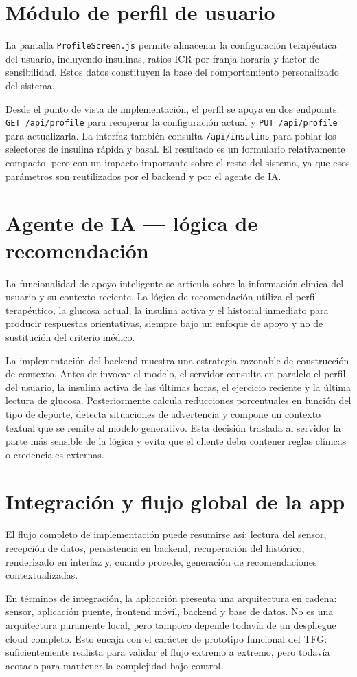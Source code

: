 \section{Módulo de perfil de usuario}

La pantalla \texttt{ProfileScreen.js} permite almacenar la configuración terapéutica del
usuario, incluyendo insulinas, ratios ICR por franja horaria y factor de sensibilidad.
Estos datos constituyen la base del comportamiento personalizado del sistema.

Desde el punto de vista de implementación, el perfil se apoya en dos endpoints:
\texttt{GET /api/profile} para recuperar la configuración actual y
\texttt{PUT /api/profile} para actualizarla. La interfaz también consulta
\texttt{/api/insulins} para poblar los selectores de insulina rápida y basal. El resultado
es un formulario relativamente compacto, pero con un impacto importante sobre el resto del
sistema, ya que esos parámetros son reutilizados por el backend y por el agente de IA.

\section{Agente de IA --- lógica de recomendación}

La funcionalidad de apoyo inteligente se articula sobre la información clínica del
usuario y su contexto reciente. La lógica de recomendación utiliza el perfil terapéutico,
la glucosa actual, la insulina activa y el historial inmediato para producir respuestas
orientativas, siempre bajo un enfoque de apoyo y no de sustitución del criterio médico.

La implementación del backend muestra una estrategia razonable de construcción de
contexto. Antes de invocar el modelo, el servidor consulta en paralelo el perfil del
usuario, la insulina activa de las últimas horas, el ejercicio reciente y la última
lectura de glucosa. Posteriormente calcula reducciones porcentuales en función del tipo de
deporte, detecta situaciones de advertencia y compone un contexto textual que se remite al
modelo generativo. Esta decisión traslada al servidor la parte más sensible de la lógica y
evita que el cliente deba contener reglas clínicas o credenciales externas.

\section{Integración y flujo global de la app}

El flujo completo de implementación puede resumirse así: lectura del sensor, recepción de
datos, persistencia en backend, recuperación del histórico, renderizado en interfaz y,
cuando procede, generación de recomendaciones contextualizadas.

En términos de integración, la aplicación presenta una arquitectura en cadena: sensor,
aplicación puente, frontend móvil, backend y base de datos. No es una arquitectura
puramente local, pero tampoco depende todavía de un despliegue cloud completo. Esto encaja
con el carácter de prototipo funcional del TFG: suficientemente realista para validar el
flujo extremo a extremo, pero todavía acotado para mantener la complejidad bajo control.